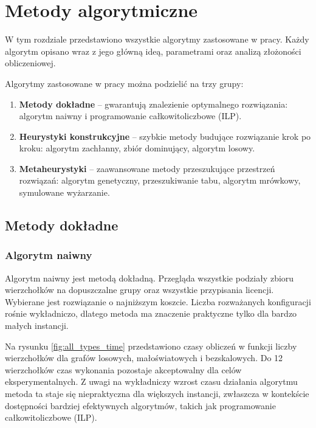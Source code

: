 \chapter{Metody algorytmiczne}\label{chap:algorithms}

W tym rozdziale przedstawiono wszystkie algorytmy zastosowane w pracy. Każdy algorytm opisano wraz z jego główną ideą, parametrami oraz analizą złożoności obliczeniowej.


Algorytmy zastosowane w pracy można podzielić na trzy grupy:
\begin{enumerate}
  \item \textbf{Metody dokładne} -- gwarantują znalezienie optymalnego rozwiązania: algorytm naiwny i programowanie całkowitoliczbowe (ILP).
  \item \textbf{Heurystyki konstrukcyjne} -- szybkie metody budujące rozwiązanie krok po kroku: algorytm zachłanny, zbiór dominujący, algorytm losowy.
  \item \textbf{Metaheurystyki} -- zaawansowane metody przeszukujące przestrzeń rozwiązań: algorytm genetyczny, przeszukiwanie tabu, algorytm mrówkowy, symulowane wyżarzanie.
\end{enumerate}

\section{Metody dokładne}

\subsection{Algorytm naiwny}\label{subsec:naive}
Algorytm naiwny jest metodą dokładną. Przegląda wszystkie podziały zbioru wierzchołków na dopuszczalne grupy oraz wszystkie przypisania licencji. Wybierane jest rozwiązanie o najniższym koszcie. Liczba rozważanych konfiguracji rośnie wykładniczo, dlatego metoda ma znaczenie praktyczne tylko dla bardzo małych instancji.

Na rysunku \ref{fig:all_types_time} przedstawiono czasy obliczeń w funkcji liczby wierzchołków dla grafów losowych, małoświatowych i bezskalowych. Do 12 wierzchołków czas wykonania pozostaje akceptowalny dla celów eksperymentalnych. Z uwagi na wykładniczy wzrost czasu działania algorytmu metoda ta staje się niepraktyczna dla większych instancji, zwłaszcza w kontekście dostępności bardziej efektywnych algorytmów, takich jak programowanie całkowitoliczbowe (ILP).

